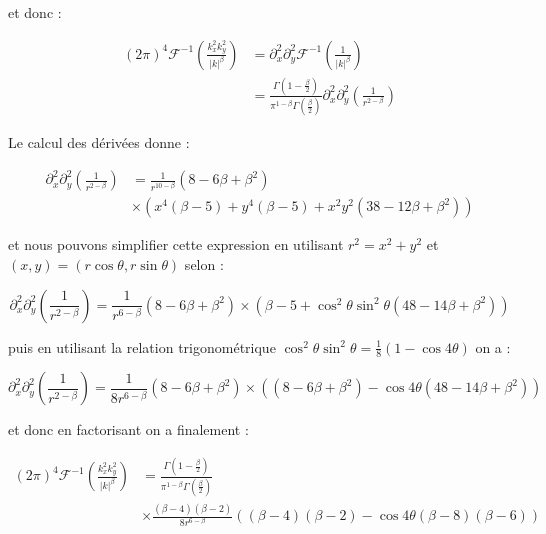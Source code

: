 \noindent et donc :

\begin{equation}
\begin{aligned}
    (2\pi)^4\mathcal{F}^{-1}\left( \frac{k_x^2k_y^2}{\lvert k \rvert^\beta} \right) &= \partial_x^2\partial_y^2\mathcal{F}^{-1}\left( \frac{1}{\lvert k \rvert^\beta} \right)\\
    &=\frac{\Gamma\left( 1-\frac{\beta}{2} \right)}{\pi^{1-\beta}\Gamma\left( \frac{\beta}{2} \right)}\partial_x^2\partial_y^2\left( \frac{1}{r^{2-\beta}} \right)
\end{aligned}
\end{equation}

\noindent Le calcul des dérivées donne :

\begin{equation}
\begin{aligned}
    \partial_x^2\partial_y^2\left( \frac{1}{r^{2-\beta}} \right) &= \frac{1}{r^{10-\beta}}(8-6\beta+\beta^2)\\
    &\times\left(x^4(\beta-5)+y^4(\beta-5)+x^2y^2(38-12\beta+\beta^2)\right)
\end{aligned}
\end{equation}

\noindent et nous pouvons simplifier cette expression en utilisant  $r^2=x^2+y^2$ et $(x,y)=(r\cos\theta,r\sin\theta)$ selon :

\begin{equation}
    \partial_x^2\partial_y^2\left( \frac{1}{r^{2-\beta}} \right) = \frac{1}{r^{6-\beta}}(8-6\beta+\beta^2)\times\left(\beta-5+\cos^2\theta\sin^2\theta(48-14\beta+\beta^2)\right)
\end{equation}

\noindent puis en utilisant la relation trigonométrique $\cos^2\theta\sin^2\theta = \frac{1}{8}(1-\cos4\theta)$ on a :

\begin{equation}
    \partial_x^2\partial_y^2\left( \frac{1}{r^{2-\beta}} \right) = \frac{1}{8r^{6-\beta}}(8-6\beta+\beta^2)\times\left((8-6\beta+\beta^2)-\cos4\theta(48-14\beta+\beta^2)\right)
\end{equation}

\noindent et donc en factorisant on a finalement :

\begin{equation}
\begin{aligned}
    (2\pi)^4\mathcal{F}^{-1}\left( \frac{k_x^2k_y^2}{\lvert k \rvert^\beta} \right) &= \frac{\Gamma\left( 1-\frac{\beta}{2} \right)}{\pi^{1-\beta}\Gamma\left( \frac{\beta}{2} \right)}\\
    &\times\frac{(\beta-4)(\beta-2)}{8r^{6-\beta}}\left( (\beta-4)(\beta-2)-\cos4\theta(\beta-8)(\beta-6) \right)
\end{aligned}
\end{equation}

